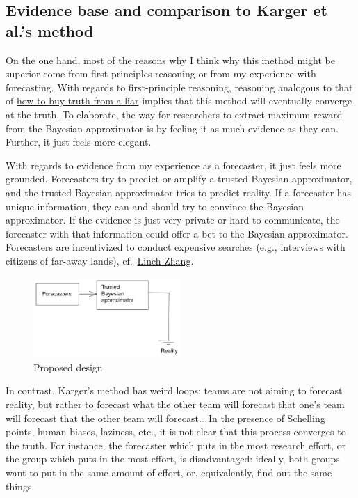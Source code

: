 \documentclass[]{article}
\begin{document}
\hypertarget{evidence-base-and-comparison-to-karger-et-al.s-method}{%
\subsection{Evidence base and comparison to Karger et al.'s
method}\label{evidence-base-and-comparison-to-karger-et-al.s-method}}

On the one hand, most of the reasons why I think why this method might
be superior come from first principles reasoning or from my experience
with forecasting. With regards to first-principle reasoning, reasoning
analogous to that of
\href{https://meteuphoric.com/2014/07/21/how-to-buy-a-truth-from-a-liar/}{how
to buy truth from a liar} implies that this method will eventually
converge at the truth. To elaborate, the way for researchers to extract
maximum reward from the Bayesian approximator is by feeling it as much
evidence as they can. Further, it just feels more elegant.

With regards to evidence from my experience as a forecaster, it just
feels more grounded. Forecasters try to predict or amplify a trusted
Bayesian approximator, and the trusted Bayesian approximator tries to
predict reality. If a forecaster has unique information, they can and
should try to convince the Bayesian approximator. If the evidence is
just very private or hard to communicate, the forecaster with that
information could offer a bet to the Bayesian approximator. Forecasters
are incentivized to conduct expensive searches (e.g., interviews with
citizens of far-away lands),
cf.~\href{https://twitter.com/LinchZhang/status/1455759586158268417}{Linch
Zhang}.

\begin{figure}
\centering
\includegraphics[width=0.5\textwidth,height=\textheight]{diagrams/amplification-diagram-1.png}
\caption{Proposed design}
\end{figure}

In contrast, Karger's method has weird loops; teams are not aiming to
forecast reality, but rather to forecast what the other team will
forecast that one's team will forecast that the other team will
forecast\ldots{} In the presence of Schelling points, human biases,
laziness, etc., it is not clear that this process converges to the
truth. For instance, the forecaster which puts in the most research
effort, or the group which puts in the most effort, is disadvantaged:
ideally, both groups want to put in the same amount of effort, or,
equivalently, find out the same things.
\end{document}
